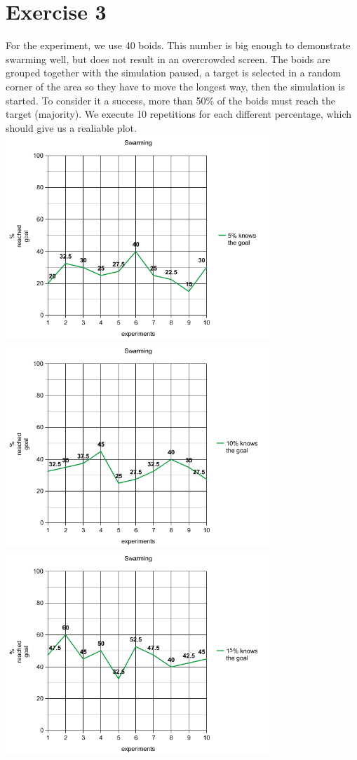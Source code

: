 \documentclass[a4paper,10pt]{article}
\begin{document}
\section*{Exercise 3}
For the experiment, we use 40 boids. This number is big enough to demonstrate swarming well, but does not
result in an overcrowded screen. The boids are grouped together with the simulation paused, a target is
selected in a random corner of the area so they have to move the longest way, then the simulation is
started. To consider it a success, more than 50\% of the boids must reach the target (majority). We 
execute 10 repetitions for each different percentage, which should give us a realiable plot.\\
\includegraphics[width=10cm]{graph.png}\\
\includegraphics[width=10cm]{graph_1.png}\\
\includegraphics[width=10cm]{graph_2.png}\\
\end{document}
